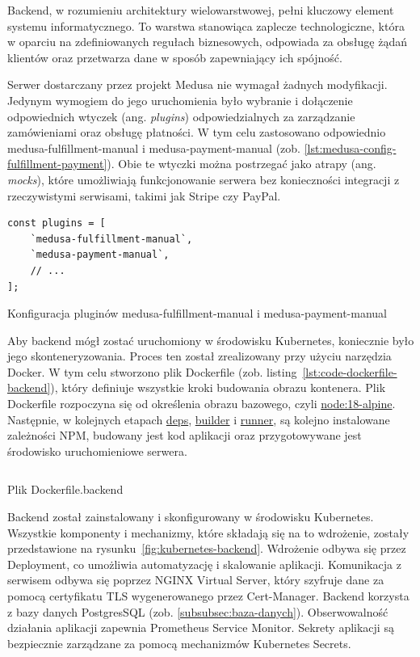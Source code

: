 Backend, w rozumieniu architektury wielowarstwowej, pełni kluczowy element systemu informatycznego.
To warstwa stanowiąca zaplecze technologiczne, która w oparciu na zdefiniowanych regułach biznesowych, odpowiada za obsługę żądań klientów oraz przetwarza dane w sposób zapewniający ich spójność.

Serwer dostarczany przez projekt Medusa nie wymagał żadnych modyfikacji.
Jedynym wymogiem do jego uruchomienia było wybranie i dołączenie odpowiednich wtyczek (ang. \emph{plugins}) odpowiedzialnych za zarządzanie zamówieniami oraz obsługę płatności.
W tym celu zastosowano odpowiednio medusa-fulfillment-manual  i medusa-payment-manual (zob. \autoref{lst:medusa-config-fulfillment-payment}).
Obie te wtyczki można postrzegać jako atrapy (ang. \emph{mocks}), które umożliwiają funkcjonowanie serwera bez konieczności integracji z rzeczywistymi serwisami, takimi jak Stripe czy PayPal.

\begin{listing}[H]
    \begin{verbatim}
const plugins = [
    `medusa-fulfillment-manual`,
    `medusa-payment-manual`,
    // ...
];
    \end{verbatim}
    \caption{Konfiguracja pluginów medusa-fulfillment-manual i medusa-payment-manual}
    \label{lst:medusa-config-fulfillment-payment}
\end{listing}

Aby backend mógł zostać uruchomiony w środowisku Kubernetes, koniecznie było jego skonteneryzowania.
Proces ten został zrealizowany przy użyciu narzędzia Docker.
W tym celu stworzono plik Dockerfile (zob. listing~\ref{lst:code-dockerfile-backend}), który definiuje wszystkie kroki budowania obrazu kontenera.
Plik Dockerfile rozpoczyna się od określenia obrazu bazowego, czyli \url{node:18-alpine}.
Następnie, w kolejnych etapach \url{deps}, \url{builder} i \url{runner}, są kolejno instalowane zależności NPM, budowany jest kod aplikacji oraz przygotowywane jest środowisko uruchomieniowe serwera.

\begin{listing}[H]
    \inputminted[xleftmargin=20pt,linenos]{docker}{code/Dockerfile.backend}
    \caption{Plik Dockerfile.backend}
    \label{lst:code-dockerfile-backend}
\end{listing}

Backend został zainstalowany i skonfigurowany w środowisku Kubernetes.
Wszystkie komponenty i mechanizmy, które składają się na to wdrożenie, zostały przedstawione na rysunku~\ref{fig:kubernetes-backend}.
Wdrożenie odbywa się przez Deployment, co umożliwia automatyzację i skalowanie aplikacji.
Komunikacja z serwisem odbywa się poprzez NGINX Virtual Server, który szyfruje dane za pomocą certyfikatu TLS wygenerowanego przez Cert-Manager.
Backend korzysta z bazy danych PostgresSQL (zob. \autoref{subsubsec:baza-danych}).
Obserwowalność działania aplikacji zapewnia Prometheus Service Monitor.
Sekrety aplikacji są bezpiecznie zarządzane za pomocą mechanizmów Kubernetes Secrets.

